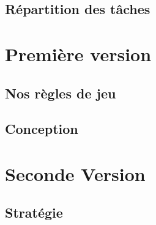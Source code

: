\documentclass[12pt,a4paper,openany]{book}
\begin{document}
	\section{Répartition des tâches}

	\chapter{Première version}
	\section{Nos règles de jeu}
	\section{Conception}

	\chapter{Seconde Version}
	\section{Stratégie}


\end{document}
